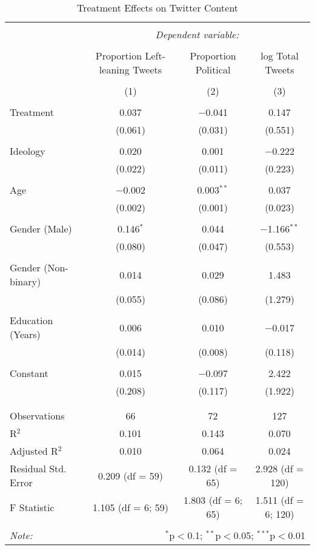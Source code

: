 
\begin{table}[!htbp] \centering 
  \caption{Treatment Effects on Twitter Content} 
  \label{} 
\begin{tabular}{@{\extracolsep{5pt}}lccc} 
\\[-1.8ex]\hline 
\hline \\[-1.8ex] 
 & \multicolumn{3}{c}{\textit{Dependent variable:}} \\ 
\cline{2-4} 
\\[-1.8ex] & Proportion Left-leaning Tweets & Proportion Political & log Total Tweets \\ 
\\[-1.8ex] & (1) & (2) & (3)\\ 
\hline \\[-1.8ex] 
 Treatment & 0.037 & $-$0.041 & 0.147 \\ 
  & (0.061) & (0.031) & (0.551) \\ 
  & & & \\ 
 Ideology & 0.020 & 0.001 & $-$0.222 \\ 
  & (0.022) & (0.011) & (0.223) \\ 
  & & & \\ 
 Age & $-$0.002 & 0.003$^{**}$ & 0.037 \\ 
  & (0.002) & (0.001) & (0.023) \\ 
  & & & \\ 
 Gender (Male) & 0.146$^{*}$ & 0.044 & $-$1.166$^{**}$ \\ 
  & (0.080) & (0.047) & (0.553) \\ 
  & & & \\ 
 Gender (Non-binary) & 0.014 & 0.029 & 1.483 \\ 
  & (0.055) & (0.086) & (1.279) \\ 
  & & & \\ 
 Education (Years) & 0.006 & 0.010 & $-$0.017 \\ 
  & (0.014) & (0.008) & (0.118) \\ 
  & & & \\ 
 Constant & 0.015 & $-$0.097 & 2.422 \\ 
  & (0.208) & (0.117) & (1.922) \\ 
  & & & \\ 
\hline \\[-1.8ex] 
Observations & 66 & 72 & 127 \\ 
R$^{2}$ & 0.101 & 0.143 & 0.070 \\ 
Adjusted R$^{2}$ & 0.010 & 0.064 & 0.024 \\ 
Residual Std. Error & 0.209 (df = 59) & 0.132 (df = 65) & 2.928 (df = 120) \\ 
F Statistic & 1.105 (df = 6; 59) & 1.803 (df = 6; 65) & 1.511 (df = 6; 120) \\ 
\hline 
\hline \\[-1.8ex] 
\textit{Note:}  & \multicolumn{3}{r}{$^{*}$p$<$0.1; $^{**}$p$<$0.05; $^{***}$p$<$0.01} \\ 
\end{tabular} 
\end{table} 
